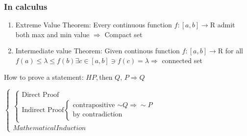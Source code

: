 


\cfoot{\thepage} %

\subsubsection{In calculus}

\begin{enumerate}
	\item Extreme Value Theorem: Every continuous function $f:[a,b]\rightarrow\mathrm{R}$ admit both max and min value $\Rightarrow$ Compact set
	\item Intermediate value Theorem: Given continous function $f:[a,b]\rightarrow \mathrm{R}$ for all $f(a) \leq \lambda \leq f(b) \exists c \in [a,b] \ni f(c) = \lambda \Rightarrow$ connected set
\end{enumerate}

How to prove a statement: $H P,$then $Q$, $P \Rightarrow Q$

$\begin{cases}
	\begin{cases}
	\text{Direct Proof}\\\text{Indirect Proof}\begin{cases}\text{contrapositive $\sim Q \Rightarrow \sim P$} \\ \text{by contradiction}\end{cases}
	\end{cases}\\
	Mathematical Induction
\end{cases}$


\newpage


